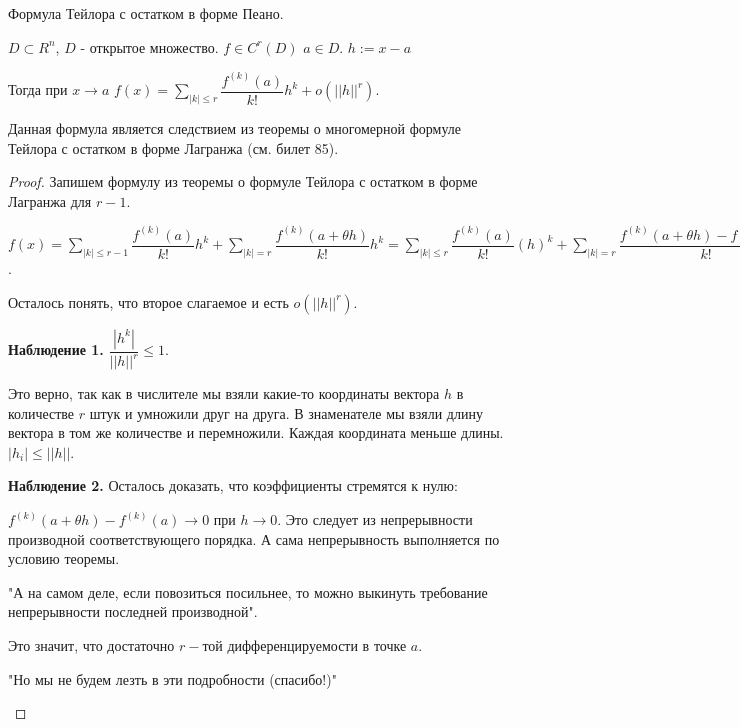 
\begin{theorem}
	
	Формула Тейлора с остатком в форме Пеано.
	
	$D \subset R^n$, $D$ - открытое множество. $f \in C^{r}(D)$ $a \in D$. $h := x - a$
	
	Тогда при $x \rightarrow a$ $f(x) = \sum\limits_{|k| \leq r}\dfrac{f^{(k)}(a)}{k!}h^k + o(||h||^r)$.
	
	\begin{remark}
		
		Данная формула является следствием из теоремы о многомерной формуле Тейлора с остатком в форме Лагранжа (см. билет 85).
	\end{remark}
	
\end{theorem}

\begin{proof}
	
	Запишем формулу из теоремы о формуле Тейлора с остатком в форме Лагранжа для $r - 1$.
	
	$f(x) = \sum\limits_{|k| \leq r - 1} \dfrac{f^{(k)}(a)}{k!}h^k + \sum\limits_{|k| = r} \dfrac{f^{(k)}(a + \theta h)}{k!}h^k = \sum\limits_{|k| \leq r}\dfrac{f^{(k)}(a)}{k!}(h)^k + \sum\limits_{|k| = r}\dfrac{f^{(k)}(a + \theta h) - f^{(k)}(a)}{k!}h^k$.
	
	Осталось понять, что второе слагаемое и есть $ o(||h||^r)$.
	
	\textbf{Наблюдение 1.}
	$\dfrac{|h^k|}{||h||^r} \leq 1$.
	
	Это верно, так как в числителе мы взяли какие-то координаты вектора $h$ в количестве $r$ штук и умножили друг на друга. В знаменателе мы взяли длину вектора в том же количестве и перемножили. Каждая координата меньше длины. $|h_i| \leq ||h||$. 
	
	\textbf{Наблюдение 2.}
	Осталось доказать, что коэффициенты стремятся к нулю:
	
	$f^{(k)}(a + \theta h) - f^{(k)}(a) \rightarrow 0$ при $h \rightarrow 0$. Это следует из непрерывности производной соответствующего порядка. А сама непрерывность выполняется по условию теоремы.
	
	\begin{remark}
		
		"А на самом деле, если повозиться посильнее, то можно выкинуть требование непрерывности последней производной".
		
		Это значит, что достаточно $r-$той дифференцируемости в точке $a$.
		
		"Но мы не будем лезть в эти подробности (спасибо!)"
	\end{remark}
	
\end{proof}

